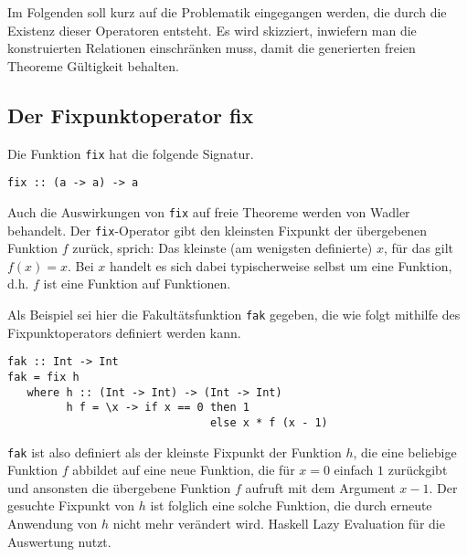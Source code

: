 
Im Folgenden soll kurz auf die Problematik eingegangen werden, die durch die Existenz dieser Operatoren entsteht. Es wird
skizziert, inwiefern man die konstruierten Relationen einschränken muss, damit die generierten freien Theoreme Gültigkeit
behalten.


\subsection{Der Fixpunktoperator fix}

Die Funktion \texttt{fix} hat die folgende Signatur.

\begin{verbatim}
fix :: (a -> a) -> a
\end{verbatim}

Auch die Auswirkungen von \texttt{fix} auf freie Theoreme werden von Wadler \cite{wadler} behandelt.
Der \texttt{fix}-Operator gibt den kleinsten Fixpunkt der übergebenen Funktion $f$
zurück, sprich: Das kleinste (am wenigsten definierte) $x$, für das gilt $f(x) = x$. Bei $x$ handelt es sich dabei
typischerweise selbst um eine Funktion, d.h. $f$ ist eine Funktion auf Funktionen.

Als Beispiel sei hier die Fakultätsfunktion \texttt{fak} gegeben, die wie folgt mithilfe des Fixpunktoperators definiert werden
kann.

\begin{verbatim}
fak :: Int -> Int
fak = fix h
   where h :: (Int -> Int) -> (Int -> Int)
         h f = \x -> if x == 0 then 1
                               else x * f (x - 1)
\end{verbatim}

\texttt{fak} ist also definiert als der kleinste Fixpunkt der Funktion $h$, die eine beliebige Funktion $f$ abbildet auf
eine neue Funktion, die für $x = 0$ einfach $1$ zurückgibt und ansonsten die übergebene Funktion $f$ aufruft mit dem
Argument $x - 1$.
Der gesuchte Fixpunkt von $h$ ist folglich eine solche Funktion, die durch erneute Anwendung von $h$ nicht mehr
verändert wird.
Haskell Lazy Evaluation für die Auswertung nutzt.


